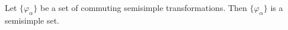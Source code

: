 Let $\{\varphi_\alpha\}$ be a set of commuting semisimple transformations. Then $\{\varphi_\alpha\}$ is a semisimple set.
